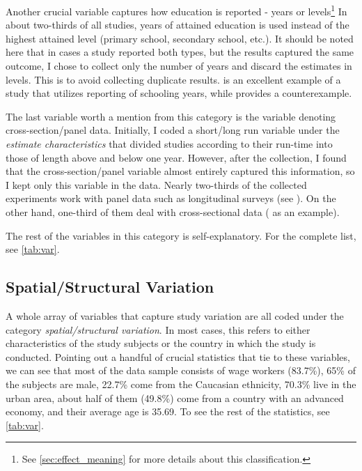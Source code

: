 Another crucial variable captures how education is reported - years or levels\footnote{See \autoref{sec:effect_meaning} for more details about this classification.} In about two-thirds of all studies, years of attained education is used instead of the highest attained level (primary school, secondary school, etc.). It should be noted here that in cases a study reported both types, but the results captured the same outcome, I chose to collect only the number of years and discard the estimates in levels. This is to avoid collecting duplicate results. \cite{harmon2002returns} is an excellent example of a study that utilizes reporting of schooling years, while \cite{duraisamy2002changes} provides a counterexample.

The last variable worth a mention from this category is the variable denoting cross-section/panel data. Initially, I coded a short/long run variable under the \textit{estimate characteristics} that divided studies according to their run-time into those of length above and below one year. However, after the collection, I found that the cross-section/panel variable almost entirely captured this information, so I kept only this variable in the data. Nearly two-thirds of the collected experiments work with panel data such as longitudinal surveys (see \cite{harmon2003returns}). On the other hand, one-third of them deal with cross-sectional data (\cite{lemieux2001education} as an example).

The rest of the variables in this category is self-explanatory. For the complete list, see \autoref{tab:var}.

\subsection{Spatial/Structural Variation}
\label{subsec:spat_str_variation}

A whole array of variables that capture study variation are all coded under the category \textit{spatial/structural variation}. In most cases, this refers to either characteristics of the study subjects or the country in which the study is conducted. Pointing out a handful of crucial statistics that tie to these variables, we can see that most of the data sample consists of wage workers (83.7\%), 65\% of the subjects are male, 22.7\% come from the Caucasian ethnicity, 70.3\% live in the urban area, about half of them (49.8\%) come from a country with an advanced economy, and their average age is 35.69. To see the rest of the statistics, see \autoref{tab:var}.

